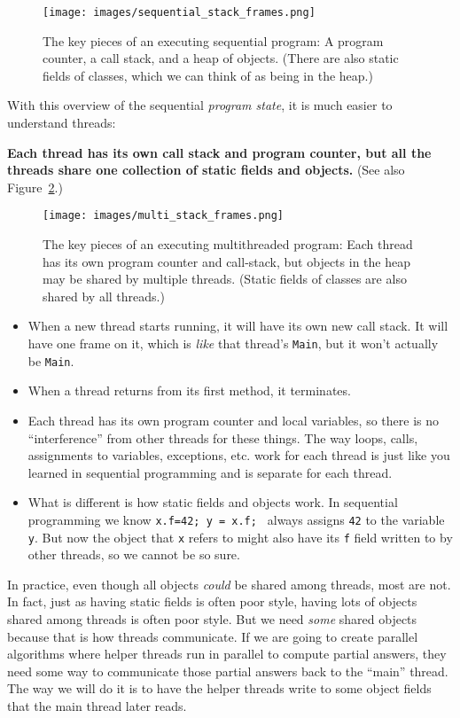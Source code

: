 \documentclass[10pt]{article}
\begin{document}
\begin{figure}
\begin{center}
\texttt{[image: images/sequential\_stack\_frames.png]}
\end{center}
\caption{The key pieces of an executing sequential program: A program
  counter, a call stack, and a heap of objects.  (There are also
  static fields of classes, which we can think of as being in the heap.)}
\label{fig:sequential_state}
\end{figure}

With this overview of the sequential \emph{program state}, it is much
easier to understand threads: 

\medskip
\noindent\textbf{Each thread has its own call
  stack and program counter, but all the threads share one collection
  of static fields and objects.} (See also Figure~\ref{fig:multi_state}.)
\medskip

\begin{figure}
\begin{center}
\texttt{[image: images/multi\_stack\_frames.png]}
\end{center}
\caption{The key pieces of an executing multithreaded program: Each
  thread has its own program counter and call-stack, but objects in
  the heap may be shared by multiple threads.  (Static fields of
  classes are also shared by all threads.)}  
\label{fig:multi_state}
\end{figure}

\begin{itemize}
\item When a new thread starts running, it will have its own new call
  stack.  It will have one frame on it, which is \emph{like} that thread's
  {\tt Main}, but it won't actually be {\tt Main}.
\item When a thread returns from its first method, it terminates.
\item Each thread has its own program counter and local variables, so
  there is no ``interference'' from other threads for these things.
  The way loops, calls, assignments to variables, exceptions,
  etc. work for each thread is just like you learned in sequential
  programming and is separate for each thread.
\item What is different is how static fields and objects work.  In
  sequential programming we know {\tt x.f=42; y = x.f; } always
  assigns {\tt 42} to the variable {\tt y}.  But now the object
  that {\tt x} refers to might also have its {\tt f} field written to
  by other threads, so we cannot be so sure.
\end{itemize}
In practice, even though all objects \emph{could} be shared among
threads, most are not.  In fact, just as having static fields
is often poor style, having lots of objects shared among threads is
often poor style.  But we need \emph{some} shared objects
because that is how threads communicate.  If we are going to create
parallel algorithms where helper threads run in parallel to compute
partial answers, they need some way to communicate those partial
answers back to the ``main'' thread.  The way we will do it is to
have the helper threads write to some object fields that the main
thread later reads.
\end{document}
